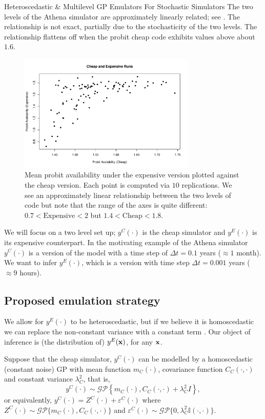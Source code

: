 \begin{chapter}{Heteroscedastic \& Multilevel GP Emulators For Stochastic Simulators\label{Ch:Hetsml}}
 The two levels of the Athena simulator are approximately linearly related; see . The relationship is not exact, partially due to the stochasticity of the two levels. The relationship flattens off when the probit cheap code exhibits values above about $1.6$.
\begin{figure}[ht]
 \centering
 \includegraphics[width=0.75\textwidth]{sml-het-fig2/cheapVexp.pdf}
\caption{Mean probit availability under the expensive version plotted against the cheap version. Each point is computed via $10$ replications. We see an approximately linear relationship between the two levels of code but note that the range of the axes is quite different: $0.7<\text{Expensive}<2$ but $1.4<\text{Cheap}<1.8$. }
 \label{Fig:cheapandexp}
\end{figure}
We will focus on a two level set up; $y^C(\cdot)$ is the cheap simulator and $y^E(\cdot)$ is its expensive counterpart. In the motivating example of the Athena simulator $y^C(\cdot)$ is a version of the model with a time step of $\Delta t = 0.1$ years ($\approx 1$ month). We want to infer $y^E (\cdot)$, which is a version with time step $\Delta t = 0.001$ years ($\approx 9$ hours).
\subsection{Proposed emulation strategy}
We allow for $y^E(\cdot)$ to be heteroscedastic, but if we believe it is homoscedastic we can replace the non-constant variance with a constant term \citep{Roth2022}. Our object of inference is (the distribution of) $y^E(\mathbf{x})$, for any $\mathbf{x}$.

Suppose that the cheap simulator, $y^C(\cdot)$ can be modelled by a homoscedastic (constant noise) GP with mean function $m_C(\cdot)$, covariance function $C_C(\cdot, \cdot)$ and constant variance $\lambda^2_C$, that is,
\begin{equation}
	y^C(\cdot) \sim \mathcal{GP} \left\{ m_C(\cdot), C_C(\cdot, \cdot) + \lambda^2_C I\right\},
\end{equation}
or equivalently, $y^C(\cdot) = Z^C(\cdot) + \varepsilon^C(\cdot)$ where $Z^C(\cdot) \sim \mathcal{GP}\{m_C(\cdot), C_C(\cdot, \cdot)\}$ and $\varepsilon^C(\cdot) \sim \mathcal{GP}\{ 0, \lambda^2_C\mathbb{I}(\cdot, \cdot)\}$.


\end{chapter}
